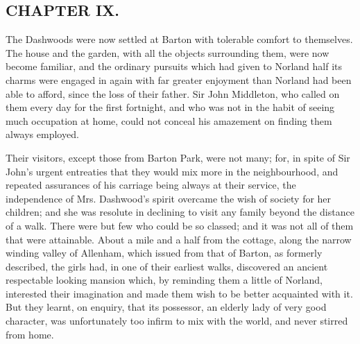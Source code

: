

\subsection[chapter-ix.]{\useURL[url9][][][]\from[url9]CHAPTER IX.}

The Dashwoods were now settled at Barton with tolerable comfort to themselves. The house and the garden, with all the objects surrounding them, were now become familiar, and the ordinary pursuits which had given to Norland half its charms were engaged in again with far greater enjoyment than Norland had been able to afford, since the loss of their father. Sir John Middleton, who called on them every day for the first fortnight, and who was not in the habit of seeing much occupation at home, could not conceal his amazement on finding them always employed.

Their visitors, except those from Barton Park, were not many; for, in spite of Sir John's urgent entreaties that they would mix more in the neighbourhood, and repeated assurances of his carriage being always at their service, the independence of Mrs. Dashwood's spirit overcame the wish of society for her children; and she was resolute in declining to visit any family beyond the distance of a walk. There were but few who could be so classed; and it was not all of them that were attainable. About a mile and a half from the cottage, along the narrow winding valley of Allenham, which issued from that of Barton, as formerly described, the girls had, in one of their earliest walks, discovered an ancient respectable looking mansion which, by reminding them a little of Norland, interested their imagination and made them wish to be better acquainted with it. But they learnt, on enquiry, that its possessor, an elderly lady of very good character, was unfortunately too infirm to mix with the world, and never stirred from home.

